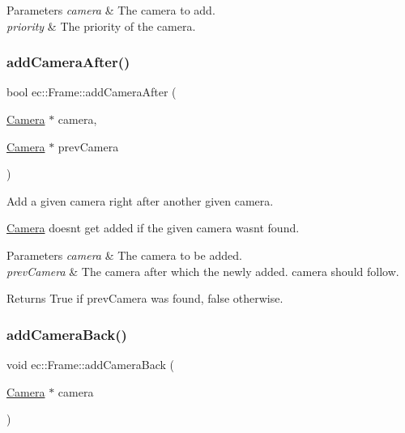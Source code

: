 \begin{DoxyParams}{Parameters}
{\em camera} & The camera to add. \\
\hline
{\em priority} & The priority of the camera. \\
\hline
\end{DoxyParams}
\mbox{\label{classec_1_1_frame_a60b34025921413dd3ea92c9146d76825}} 
\subsubsection{\texorpdfstring{add\+Camera\+After()}{addCameraAfter()}}
{\footnotesize\ttfamily bool ec\+::\+Frame\+::add\+Camera\+After (\begin{DoxyParamCaption}\item[{\mbox{\hyperlink{classec_1_1_camera}{Camera}} $\ast$}]{camera,  }\item[{\mbox{\hyperlink{classec_1_1_camera}{Camera}} $\ast$}]{prev\+Camera }\end{DoxyParamCaption})}



Add a given camera right after another given camera. 

\mbox{\hyperlink{classec_1_1_camera}{Camera}} doesn\textquotesingle{}t get added if the given camera wasn\textquotesingle{}t found. 
\begin{DoxyParams}{Parameters}
{\em camera} & The camera to be added. \\
\hline
{\em prev\+Camera} & The camera after which the newly added. camera should follow. \\
\hline
\end{DoxyParams}
\begin{DoxyReturn}{Returns}
True if prev\+Camera was found, false otherwise. 
\end{DoxyReturn}
\mbox{\label{classec_1_1_frame_a1cfcb26e088e6f6b07103af8ac9d3bfa}} 
\subsubsection{\texorpdfstring{add\+Camera\+Back()}{addCameraBack()}}
{\footnotesize\ttfamily void ec\+::\+Frame\+::add\+Camera\+Back (\begin{DoxyParamCaption}\item[{\mbox{\hyperlink{classec_1_1_camera}{Camera}} $\ast$}]{camera }\end{DoxyParamCaption})}



